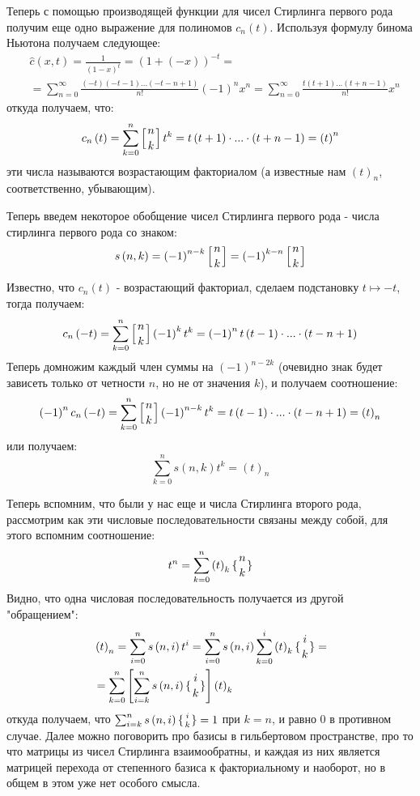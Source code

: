 Теперь с помощью производящей функции для чисел Стирлинга первого рода получим еще одно выражение для полиномов $c_n\left(t\right)$. Используя формулу бинома Ньютона получаем следующее:
\[
	\begin{split}
		& \hat c\left(x,t\right) = \frac{1}{\left(1-x\right)^t} = \left(1 + \left(-x\right)\right)^{-t} = \\
		& = \sum_{n=0}^{\infty} \frac{\left(-t\right)\left(-t-1\right) ... \left(-t - n + 1\right)}{n!} \left(-1\right)^n x^n = \sum_{n=0}^{\infty} \frac{t\left(t+1\right)...\left(t+n-1\right)}{n!} x^n
	\end{split}
\]
откуда получаем, что:
\[
	c_n\left(t\right) = \sum_{k=0}^n \left[n\atop k\right] t^k = t\left(t+1\right)\cdot ... \cdot\left(t+n-1\right) = \left(t\right)^{n}
\]
эти числа называются возрастающим факториалом (а известные нам $\left(t\right)_n$, соответственно, убывающим).

Теперь введем некоторое обобщение чисел Стирлинга первого рода - числа стирлинга первого рода со знаком:
\[
	s\left(n,k\right) = \left(-1\right)^{n-k} \left[n\atop k\right] = \left(-1\right)^{k-n} \left[n\atop k\right]
\]

Известно, что $c_n\left(t\right)$ - возрастающий факториал, сделаем подстановку $t \mapsto -t$, тогда получаем:
\[
	c_n\left(-t\right) = \sum_{k=0}^n \left[n\atop k\right] \left(-1\right)^k t^k = \left(-1\right)^n t \left(t-1\right)\cdot ... \cdot\left(t-n+1\right)
\]
Теперь домножим каждый член суммы на $\left(-1\right)^{n-2k}$ (очевидно знак будет зависеть только от четности $n$, но не от значения $k$), и получаем соотношение:
\[
	\left(-1\right)^n c_n\left(-t\right) = \sum_{k=0}^{n} \left[n\atop k\right] \left(-1\right)^{n-k} t^k = t\left(t-1\right)\cdot ... \cdot\left(t-n+1\right) = \left(t\right)_n
\]
или получаем:
\[
	\sum_{k=0}^n s\left(n,k\right) t^k = \left(t\right)_n
\]

Теперь вспомним, что были у нас еще и числа Стирлинга второго рода, рассмотрим как эти числовые последовательности связаны между собой, для этого вспомним соотношение:
\[
	t^n = \sum_{k=0}^n \left(t\right)_k \{ {{n}\atop {k}}\}
\]
Видно, что одна числовая последовательность получается из другой "обращением":
\[
	\begin{split}
		& \left(t\right)_n = \sum_{i=0}^n s\left(n,i\right)t^i = \sum_{i=0}^ns\left(n,i\right) \sum_{k=0}^i\left(t\right)_k\{ {{i}\atop {k}}\} =\\
		& = \sum_{k=0}^n \left[\sum_{i=k}^n s\left(n,i\right)\{ {{i} \atop {k}}\} \right] \left(t\right)_k
	\end{split}
\]
откуда получаем, что $\sum_{i=k}^n s\left(n,i\right)\{ {{i} \atop {k}}\} = 1$ при $k=n$, и равно 0 в противном случае. Далее можно поговорить про базисы в гильбертовом пространстве, про то что матрицы из чисел Стирлинга взаимообратны, и каждая из них является матрицей перехода от степенного базиса к факториальному и наоборот, но в общем в этом уже нет особого смысла.


